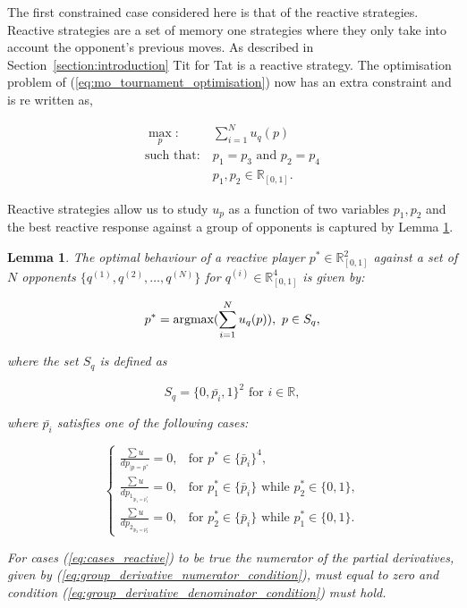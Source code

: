 \documentclass[10pt]{article}
\newcommand{\R}{\mathbb{R}}
\newtheorem{lemma}[theorem]{Lemma}
\begin{document}
The first constrained case considered here is that of the reactive strategies.
Reactive strategies are a set of memory one strategies where they only take into
account the opponent's previous moves. As described in Section~\ref{section:introduction}
Tit for Tat is a reactive strategy. The optimisation problem of (\ref{eq:mo_tournament_optimisation})
now has an extra constraint and is re written as,

\begin{equation}\label{eq:reactive_tournament_optimisation}
\begin{aligned}
\max_p: & \ \sum_{i=1} ^ N u_q(p)
\\
\text{such that}: & \ p_1 = p_3 \text{ and } p_2 = p_4\\
    & \ p_1, p_2 \in \R_{[0, 1]}.
\end{aligned}
\end{equation}

Reactive strategies allow us to study \(u_p\) as a function of two variables
\(p_1, p_2\) and the best reactive response against a group of opponents is captured by Lemma
\ref{lemma:reactive_group_best_response}.

\begin{lemma}\label{lemma:reactive_group_best_response}
    The optimal behaviour of a reactive player \(p^* \in \R_{[0, 1]} ^ 2\) against a set
    of \(N\) opponents \(\{q^{(1)}, q^{(2)}, \dots, q^{(N)} \}\) for \(q^{(i)} \in
    \R_{[0, 1]} ^ 4\) is given by:

    \[p^* = \textnormal{argmax}(\sum\limits_{i=1} ^ N  u_q(p)), \ p \in S_q,\]

    where the set \(S_q\) is defined as

    \[S_q = \{0, \bar{p_i}, 1 \} ^ 2 \text{ for } i \in \R,\]

    where \(\bar{p_i}\) satisfies one of the following cases:

    \begin{equation}\label{eq:cases_reactive}
        \left\{\begin{array}{lr}
        \frac{\sum u}{dp_{|p=p^*}} = 0, & \text{for } p^* \in \{\bar{p}_i\} ^ 4, \\
        \frac{\sum u}{dp_{1_{|p_1=p_1^*}}} = 0, & \text{for } p_1^* \in \{\bar{p}_i\}
        \text{ while } p_2 ^ * \in \{0, 1\},\\
        \frac{\sum u}{dp_{2_{|p_2=p_2^*}}} = 0, & \text{for } p_2^* \in \{\bar{p}_i\}
        \text{ while } p_1 ^ * \in \{0, 1\}.
        \end{array}\right.
    \end{equation}

    For cases (\ref{eq:cases_reactive}) to be true the numerator of the partial
    derivatives, given by (\ref{eq:group_derivative_numerator_condition}), must equal
    to zero and condition (\ref{eq:group_derivative_denominator_condition}) must hold.
\end{lemma}
\end{document}
